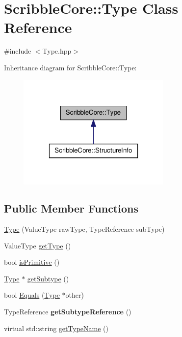 \hypertarget{class_scribble_core_1_1_type}{\section{Scribble\-Core\-:\-:Type Class Reference}
\label{class_scribble_core_1_1_type}
}


{\ttfamily \#include $<$Type.\-hpp$>$}



Inheritance diagram for Scribble\-Core\-:\-:Type\-:
\nopagebreak
\begin{figure}[H]
\begin{center}
\leavevmode
\includegraphics[width=214pt]{class_scribble_core_1_1_type__inherit__graph}
\end{center}
\end{figure}
\subsection*{Public Member Functions}
\begin{DoxyCompactItemize}
\item 
\hyperlink{class_scribble_core_1_1_type_a2d6f4b2fd9cfe25e15441e8d7b441710}{Type} (Value\-Type raw\-Type, Type\-Reference sub\-Type)
\item 
Value\-Type \hyperlink{class_scribble_core_1_1_type_a7b465695c97c0e07457f46c7ac18a96c}{get\-Type} ()
\item 
bool \hyperlink{class_scribble_core_1_1_type_ae3668b9dc9195516bfdeb9f2265d78a5}{is\-Primitive} ()
\item 
\hyperlink{class_scribble_core_1_1_type}{Type} $\ast$ \hyperlink{class_scribble_core_1_1_type_a65ef83531886c3aba0f7f7e89caaeaf1}{get\-Subtype} ()
\item 
bool \hyperlink{class_scribble_core_1_1_type_add26d29b25d99be9bc7f769e53539c24}{Equals} (\hyperlink{class_scribble_core_1_1_type}{Type} $\ast$other)
\item 
\hypertarget{class_scribble_core_1_1_type_ad0f401473ee20d081314cd3f7fbe1739}{Type\-Reference {\bfseries get\-Subtype\-Reference} ()}\label{class_scribble_core_1_1_type_ad0f401473ee20d081314cd3f7fbe1739}

\item 
virtual std\-::string \hyperlink{class_scribble_core_1_1_type_aa3eeef0216f910c6a2ae8047336b51f1}{get\-Type\-Name} ()
\end{DoxyCompactItemize}


